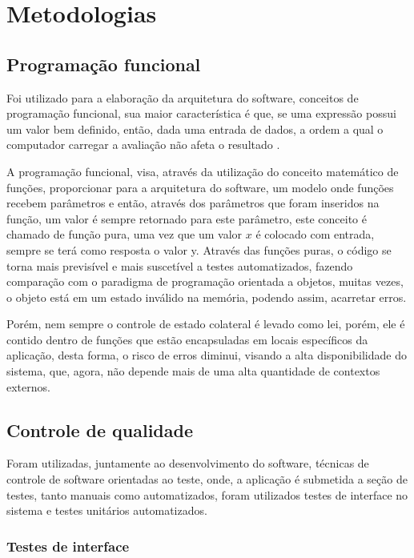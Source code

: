 \section{Metodologias}

\subsection{Programação funcional}

Foi utilizado para a elaboração da arquitetura do software, conceitos de programação funcional, sua maior característica é que, se uma expressão possui um valor bem definido, então, dada uma entrada de dados, a ordem a qual o computador carregar a avaliação não afeta o resultado \cite{introduction_functional}.

A programação funcional, visa, através da utilização do conceito matemático de funções, proporcionar para a arquitetura do software, um modelo onde funções recebem parâmetros e então, através dos parâmetros que foram inseridos na função, um valor é sempre retornado para este parâmetro, este conceito é chamado de função pura, uma vez que um valor $x$ é colocado com entrada, sempre se terá como resposta o valor y. Através das funções puras, o código se torna mais previsível e mais suscetível a testes automatizados, fazendo comparação com o paradigma de programação orientada a objetos, muitas vezes, o objeto está em um estado inválido na memória, podendo assim, acarretar erros.

Porém, nem sempre o controle de estado colateral é levado como lei, porém, ele é contido dentro de funções que estão encapsuladas em locais específicos da aplicação, desta forma, o risco de erros diminui, visando a alta disponibilidade do sistema, que, agora, não depende mais de uma alta quantidade de contextos externos.

\subsection{Controle de qualidade}

Foram utilizadas, juntamente ao desenvolvimento do software, técnicas de controle de software orientadas ao teste, onde, a aplicação é submetida a seção de testes, tanto manuais como automatizados, foram utilizados testes de interface no sistema e testes unitários automatizados.

\subsubsection{Testes de interface}

